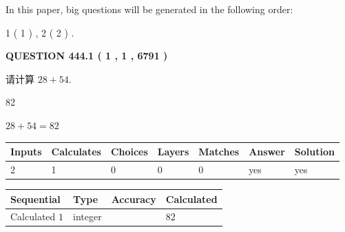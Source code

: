 \documentclass{ctexart}
\begin{document}
   
   
\vspace{0.2in}
   
In this paper, big questions will be generated in the following order: 
   
   
   1 ( 1 )
 ,
   2 ( 2 )
 .
  
\vspace{0.2in}
  
{\textbf{\Large{QUESTION
444.1 
 ( 1 , 1 , 6791 )
}}}
  
  
 
请计算 $ %
28 +  %
54 $.
 
 
 
\noindent{}
 
 

82
 
 
\noindent{}
 
 

 
 
 
\noindent{}
 
 

$ %
28 +  %
54=   %
82$
 
 
\noindent{}
 
 

 
   
   
   
   
\noindent\begin{tabular}{|l|l|l|l|l|l|l|}
 \hline
Inputs & Calculates & Choices & Layers & Matches & Answer & Solution \\ \hline
 2  & 
 1  & 
 0
  & 
 0  & 
 0  & 
  yes & 
  yes 
  \\ \hline
 \end{tabular}
   
   
   
   
\noindent{}
   
   
  
  
\noindent\begin{tabular}{|l|l|l|l|}
\hline
 Sequential & Type & Accuracy & Calculated \\ 
\hline
 
 
  Calculated $  1 $ & integer &  & 
  $ 82 $ 
 \\  \hline  
 \end{tabular}
   
\end{document}
